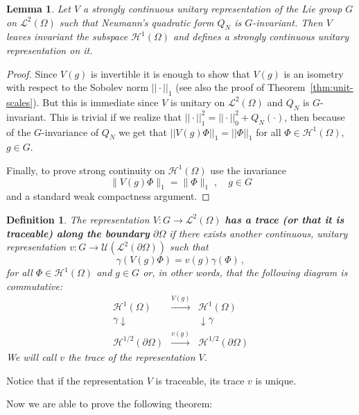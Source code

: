 \documentclass[a4paper,12pt]{amsart}
\newcommand{\norm}[1]{\|#1\|}
\renewcommand{\L}{\mathcal{L}}
\newcommand{\1}{\mathbb{I}}
\newtheorem{definition}[theorem]{Definition}
\newtheorem{lemma}[theorem]{Lemma}
\numberwithin{equation}{section}
\numberwithin{theorem}{section}
\begin{document}
\begin{lemma}  
Let $V$ a strongly continuous unitary representation of the Lie group $G$ on $\L^2(\Omega)$ such that 
Neumann's quadratic form $Q_N$ is $G$-invariant.  Then $V$ leaves invariant the subspace $\mathcal{H}^{1}(\Omega)$ 
and defines a strongly continuous unitary representation on it.
\end{lemma}
\begin{proof}  
Since $V(g)$ is invertible it is enough to show that $V(g)$ is an isometry with respect to the 
Sobolev norm $|| \cdot ||_1$ (see also the proof of Theorem~\ref{thm:unit-scales}). But this is immediate
since $V$ is unitary on $\L^2(\Omega)$ and $Q_N$ is $G$-invariant.
This is trivial if we realize that $||\cdot ||_1^2 = ||\cdot ||_0^2 + Q_N(\cdot )$, then because of the $G$-invariance 
of $Q_N$ we get that $||V(g) \Phi ||_1 = || \Phi ||_1$ for all $\Phi \in \mathcal{H}^{1}(\Omega)$, $g \in G$.

Finally, to prove strong continuity on $\mathcal{H}^{1}(\Omega)$ use the invariance
\[
 \| V(g)\Phi \|_1 = \norm{\Phi}_1\;,\quad g\in G
\]
and a standard weak compactness argument.
\end{proof}

\begin{definition} \label{def:traceable}
The representation $V\colon G\to \L^2(\Omega)$ {\bf has a trace (or that it is traceable) along the boundary} 
$\partial \Omega$ if there exists another continuous, unitary representation $v \colon G\to \mathcal{U}( \L^2(\partial \Omega))$ 
such that 
\begin{equation}\label{VPhi=vphi}
\gamma( V(g) \Phi ) = v(g)  \gamma (\Phi)  \, ,
\end{equation} 
for all $\Phi \in \mathcal{H}^1(\Omega)$ and $g\in G$ or, in other words, that the following diagram is commutative:
$$
\begin{array}{ccc}   \mathcal{H}^{1}(\Omega) & \overset{V(g)}{\longrightarrow} & \mathcal{H}^{1}(\Omega) \\
\gamma \downarrow & & \downarrow \gamma \\
 \mathcal{H}^{1/2}(\partial\Omega) & \overset{v(g)}{\longrightarrow}& \mathcal{H}^{1/2}(\partial\Omega)
\end{array}
$$
We will call $v$ the trace of the representation $V$.
\end{definition}

Notice that if the representation $V$ is traceable, its trace $v$ is unique.  

Now we are able to prove the following theorem:
\end{document}
